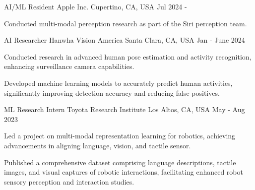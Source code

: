


\begin{cventries}
\cventry
{AI/ML Resident} %
{Apple Inc.} %
{Cupertino, CA, USA} %
{Jul 2024 - } %
{ %
\begin{cvitems}
    \item Conducted multi-modal perception research as part of the Siri perception team.
\end{cvitems}
}


\cventry
{AI Researcher} %
{Hanwha Vision America} %
{Santa Clara, CA, USA} %
{Jan - June 2024} %
{ %
\begin{cvitems}
    \item Conducted research in advanced human pose estimation and activity recognition, enhancing surveillance camera capabilities.
    \item Developed machine learning models to accurately predict human activities, significantly improving detection accuracy and reducing false positives.
\end{cvitems}
}


\cventry
{ML Research Intern} %
{Toyota Research Institute} %
{Los Altos, CA, USA} %
{May - Aug 2023} %
{ %
\begin{cvitems}
    \item Led a project on multi-modal representation learning for robotics, achieving advancements
        in aligning language, vision, and tactile sensor.
    \item Published a comprehensive dataset comprising language descriptions, tactile images, and visual captures of robotic interactions, facilitating enhanced robot sensory perception and interaction studies.
\end{cvitems}
}


\end{cventries}
